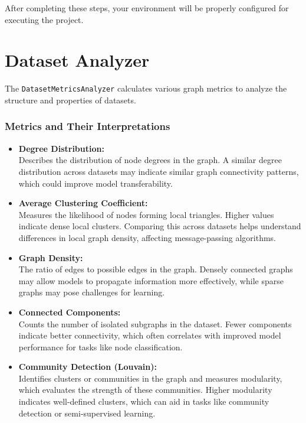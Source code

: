 	After completing these steps, your environment will be properly configured for executing the project.
	
	\newpage
	\section{Dataset Analyzer}\label{sec:dataset-metrics-analyzer}
	
	The \texttt{DatasetMetricsAnalyzer} calculates various graph metrics to analyze the structure and properties of datasets. 
	
	\subsubsection*{Metrics and Their Interpretations}
	\begin{itemize}
		\item \textbf{Degree Distribution:} \\
		Describes the distribution of node degrees in the graph. A similar degree distribution across datasets may indicate similar graph connectivity patterns, which could improve model transferability.
		
		\item \textbf{Average Clustering Coefficient:} \\
		Measures the likelihood of nodes forming local triangles. Higher values indicate dense local clusters. Comparing this across datasets helps understand differences in local graph density, affecting message-passing algorithms.
		
		\item \textbf{Graph Density:} \\
		The ratio of edges to possible edges in the graph. Densely connected graphs may allow models to propagate information more effectively, while sparse graphs may pose challenges for learning.
		
		\item \textbf{Connected Components:} \\
		Counts the number of isolated subgraphs in the dataset. Fewer components indicate better connectivity, which often correlates with improved model performance for tasks like node classification.
		
		\item \textbf{Community Detection (Louvain):} \\
		Identifies clusters or communities in the graph and measures modularity, which evaluates the strength of these communities. Higher modularity indicates well-defined clusters, which can aid in tasks like community detection or semi-supervised learning.
		

\end{itemize}
